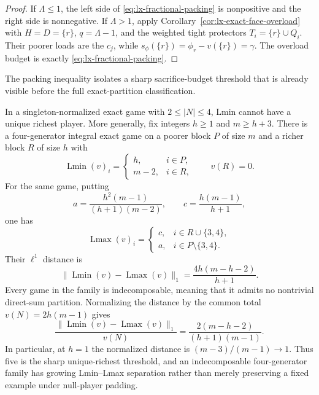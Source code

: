 \begin{proof}
If $\Lambda\leq1$, the left side of
\eqref{eq:lx-fractional-packing} is nonpositive and the right side is
nonnegative.  If $\Lambda>1$, apply
Corollary~\ref{cor:lx-exact-face-overload} with
$H=D=\{r\}$, $q=\Lambda-1$, and the weighted tight protectors
$T_i=\{r\}\cup Q_i$.  Their poorer loads are the $c_j$, while
$s_\phi(\{r\})=\phi_r-v(\{r\})=\gamma$.  The overload budget is exactly
\eqref{eq:lx-fractional-packing}.
\end{proof}

The packing inequality isolates a sharp sacrifice-budget threshold that is
already visible before the full exact-partition classification.

\begin{theorem}
\label{thm:lx-unique-richest-threshold}
In a singleton-normalized exact game with $2\leq|N|\leq4$, Lmin cannot have a
unique richest player.  More generally, fix integers $h\geq1$ and
$m\geq h+3$.  There is a four-generator integral exact game on a poorer block
$P$ of size $m$ and a richer block $R$ of size $h$ with
\[
 \operatorname{Lmin}(v)_i=
 \begin{cases}
 h,&i\in P,\\
 m-2,&i\in R,
 \end{cases}
 \qquad v(R)=0.
\]
For the same game, putting
\[
 a=\frac{h^2(m-1)}{(h+1)(m-2)},\qquad
 c=\frac{h(m-1)}{h+1},
\]
one has
\[
 \operatorname{Lmax}(v)_i=
 \begin{cases}
 c,&i\in R\cup\{3,4\},\\
 a,&i\in P\setminus\{3,4\}.
 \end{cases}
\]
Their $\ell^1$ distance is
\[
 \lVert\operatorname{Lmin}(v)-\operatorname{Lmax}(v)\rVert_1
 =\frac{4h(m-h-2)}{h+1}.
\]
Every game in the family is indecomposable, meaning that it admits no
nontrivial direct-sum partition.  Normalizing the distance by the
common total $v(N)=2h(m-1)$ gives
\[
 \frac{\lVert\operatorname{Lmin}(v)-\operatorname{Lmax}(v)\rVert_1}{v(N)}
 =\frac{2(m-h-2)}{(h+1)(m-1)}.
\]
In particular, at $h=1$ the normalized distance is
$(m-3)/(m-1)\to1$.  Thus five is the sharp unique-richest threshold, and an
indecomposable four-generator family has growing Lmin--Lmax separation rather
than merely preserving a fixed example under null-player padding.
\end{theorem}


